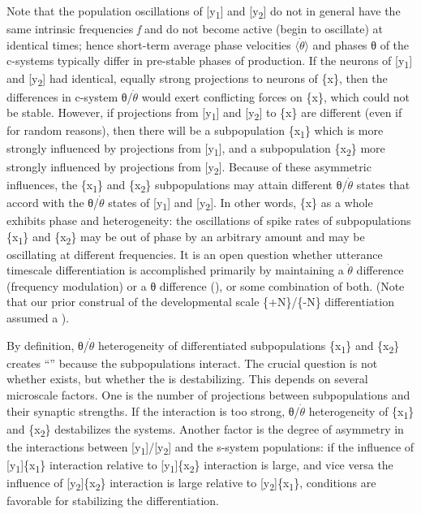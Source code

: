   Note that the population oscillations of [y\textsubscript{1}] and [y\textsubscript{2}] do not in general have the same intrinsic frequencies \textit{f} and do not become active (begin to oscillate) at identical times; hence short-term average phase velocities $\langle\dot{\theta}\rangle$ and phases θ of the c-systems typically differ in pre-stable phases of production. If the neurons of [y\textsubscript{1}] and [y\textsubscript{2}] had identical, equally strong projections to neurons of \{x\}, then the differences in c-system θ/$\dot{\theta}$ would exert conflicting forces on \{x\}, which could not be stable. However, if projections from [y\textsubscript{1}] and [y\textsubscript{2}] to \{x\} are different (even if for random reasons), then there will be a subpopulation \{x\textsubscript{1}\} which is more strongly influenced by projections from [y\textsubscript{1}], and a subpopulation \{x\textsubscript{2}\} more strongly influenced by projections from [y\textsubscript{2}]. Because of these asymmetric influences, the \{x\textsubscript{1}\} and \{x\textsubscript{2}\} subpopulations may attain different θ/$\dot{\theta}$ states that accord with the θ/$\dot{\theta}$ states of [y\textsubscript{1}] and [y\textsubscript{2}]. In other words, \{x\} as a whole exhibits phase and  heterogeneity: the oscillations of spike rates of subpopulations \{x\textsubscript{1}\} and \{x\textsubscript{2}\} may be out of phase by an arbitrary amount and may be oscillating at different frequencies. It is an open question whether utterance timescale differentiation is accomplished primarily by maintaining a $\dot{\theta}$ difference (frequency modulation) or a θ difference (), or some combination of both. (Note that our prior construal of the developmental scale \{+N\}/\{-N\} differentiation assumed a ).

  By definition, θ/$\dot{\theta}$ heterogeneity of differentiated subpopulations \{x\textsubscript{1}\} and \{x\textsubscript{2}\} creates “” because the subpopulations interact. The crucial question is not whether  exists, but whether the  is destabilizing. This depends on several microscale factors. One is the number of projections between subpopulations and their synaptic strengths. If the interaction is too strong, θ/$\dot{\theta}$ heterogeneity of \{x\textsubscript{1}\} and \{x\textsubscript{2}\} destabilizes the systems. Another factor is the degree of asymmetry in the interactions between [y\textsubscript{1}]/[y\textsubscript{2}] and the s-system populations: if the influence of [y\textsubscript{1}]\{x\textsubscript{1}\} interaction relative to [y\textsubscript{1}]\{x\textsubscript{2}\} interaction is large, and vice versa the influence of [y\textsubscript{2}]\{x\textsubscript{2}\} interaction is large relative to [y\textsubscript{2}]\{x\textsubscript{1}\}, conditions are favorable for stabilizing the differentiation.


